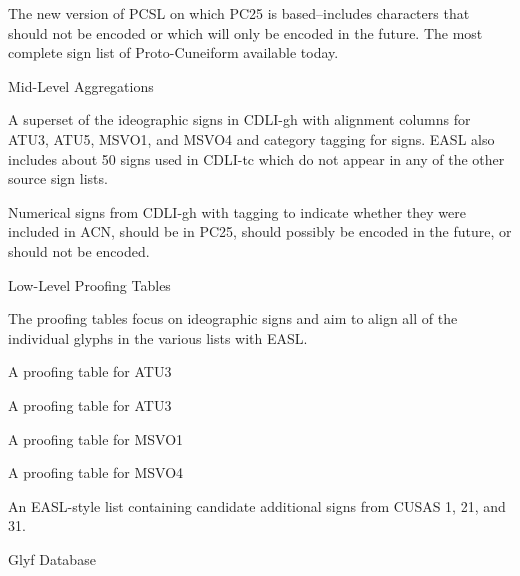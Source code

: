 \Hdt{}

{}The new version of PCSL on which PC25 is based--includes
      characters that should not be encoded or which will only be
      encoded in the future.  The most complete sign list of
      Proto-Cuneiform available today.

\Henddl
\Hhh{}Mid-Level Aggregations

\Hdl\Hdt{}

{}A superset of the ideographic signs in CDLI-gh with
      alignment columns for ATU3, ATU5, MSVO1, and MSVO4 and category
      tagging for signs.  EASL also includes about 50 signs used in
      CDLI-tc which do not appear in any of the other source sign
      lists.

\Hdt{}

{}Numerical signs from CDLI-gh with tagging to indicate
      whether they were included in ACN, should be in PC25, should
      possibly be encoded in the future, or should not be
      encoded.

\Henddl
\Hhh{}Low-Level Proofing Tables


\par The proofing tables focus on ideographic signs and aim to align
    all of the individual glyphs in the various lists with EASL.

\Hdl\Hdt{}

{}A proofing table for ATU3

\Hdt{}

{}A proofing table for ATU3

\Hdt{}

{}A proofing table for MSVO1

\Hdt{}

{}A proofing table for MSVO4

\Hdt{}

{}An EASL-style list containing candidate additional signs
      from CUSAS 1, 21, and 31.

\Henddl
\Hh{}Glyf Database

